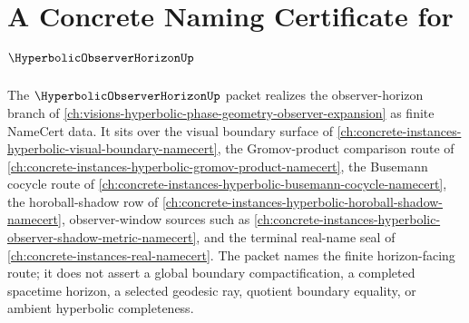 \chapter{A Concrete Naming Certificate for $\HyperbolicObserverHorizonUp$}
\label{ch:concrete-instances-hyperbolic-observer-horizon-namecert}

The $\HyperbolicObserverHorizonUp$ packet realizes the observer-horizon branch of \autoref{ch:visions-hyperbolic-phase-geometry-observer-expansion} as finite NameCert data. It sits over the visual boundary surface of \autoref{ch:concrete-instances-hyperbolic-visual-boundary-namecert}, the Gromov-product comparison route of \autoref{ch:concrete-instances-hyperbolic-gromov-product-namecert}, the Busemann cocycle route of \autoref{ch:concrete-instances-hyperbolic-busemann-cocycle-namecert}, the horoball-shadow row of \autoref{ch:concrete-instances-hyperbolic-horoball-shadow-namecert}, observer-window sources such as \autoref{ch:concrete-instances-hyperbolic-observer-shadow-metric-namecert}, and the terminal real-name seal of \autoref{ch:concrete-instances-real-namecert}. The packet names the finite horizon-facing route; it does not assert a global boundary compactification, a completed spacetime horizon, a selected geodesic ray, quotient boundary equality, or ambient hyperbolic completeness.

